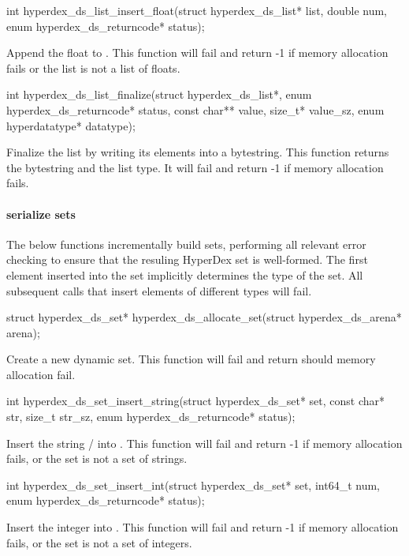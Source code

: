 \funcsep
\begin{ccode}
int hyperdex_ds_list_insert_float(struct hyperdex_ds_list* list, double num,
                                  enum hyperdex_ds_returncode* status);
\end{ccode}
\funcdesc Append the float  to .  This function will fail
and return -1 if memory allocation fails or the list is not a list of floats.

\funcsep
\begin{ccode}
int hyperdex_ds_list_finalize(struct hyperdex_ds_list*,
                              enum hyperdex_ds_returncode* status,
                              const char** value, size_t* value_sz,
                              enum hyperdatatype* datatype);
\end{ccode}
\funcdesc Finalize the list by writing its elements into a bytestring.  This
function returns the bytestring and the list type.  It will fail and return -1
if memory allocation fails.

\paragraph{serialize sets}

The below functions incrementally build sets, performing all relevant error
checking to ensure that the resuling HyperDex set is well-formed.  The first
element inserted into the set implicitly determines the type of the set.  All
subsequent calls that insert elements of different types will fail.

\begin{ccode}
struct hyperdex_ds_set* hyperdex_ds_allocate_set(struct hyperdex_ds_arena* arena);
\end{ccode}
\funcdesc Create a new dynamic set.  This function will fail and return
 should memory allocation fail.

\funcsep
\begin{ccode}
int hyperdex_ds_set_insert_string(struct hyperdex_ds_set* set,
                                  const char* str, size_t str_sz,
                                  enum hyperdex_ds_returncode* status);
\end{ccode}
\funcdesc Insert the string / into .  This
function will fail and return -1 if memory allocation fails, or the set is not a
set of strings.

\funcsep
\begin{ccode}
int hyperdex_ds_set_insert_int(struct hyperdex_ds_set* set, int64_t num,
                               enum hyperdex_ds_returncode* status);
\end{ccode}
\funcdesc Insert the integer  into .  This function will
fail and return -1 if memory allocation fails, or the set is not a set of
integers.

